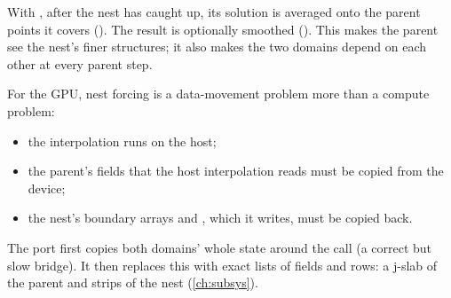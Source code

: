 With , after the nest has caught up, its solution is averaged onto the parent points it covers
(). The result is optionally smoothed (). This makes the parent see the
nest's finer structures; it also makes the two domains depend on each other at every parent step.

\begin{portnote}
For the GPU, nest forcing is a data-movement problem more than a compute problem:
\begin{itemize}
  \item the interpolation runs on the host;
  \item the parent's fields that the host interpolation reads must be copied from the device;
  \item the nest's boundary arrays and , which it writes, must be copied back.
\end{itemize}
The port first copies both domains' whole state around the call (a correct but slow bridge). It then replaces this
with exact lists of fields and rows: a j-slab of the parent and strips of the nest (\cref{ch:subsys}).
\end{portnote}

